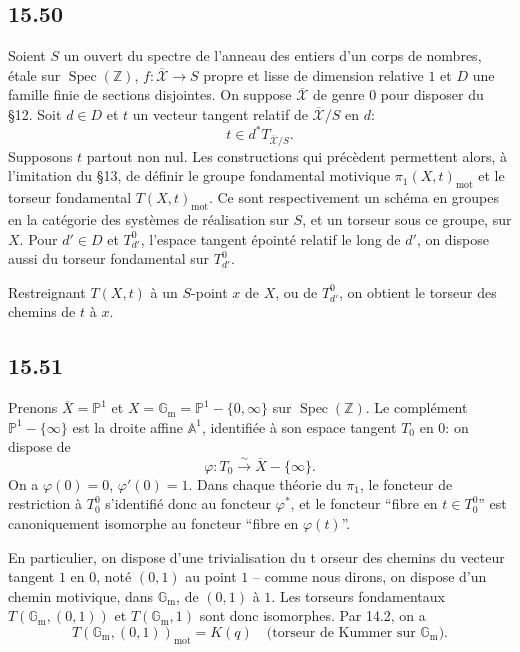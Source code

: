 \documentclass[12pt,a4paper]{article}
\theoremstyle{plain}
\theoremstyle{definition}
\theoremstyle{remark}
\DeclareMathOperator{\Spec}{Spec}
\newcommand*{\Gm}{\mathbb{G}_\mathrm{m}}
\newcommand{\bZ}{\mathbb{Z}}
\newcommand{\bP}{\mathbb{P}}
\newcommand{\bA}{\mathbb{A}}
\newcommand{\mot}{\mathrm{mot}}
\begin{document}
\subsection*{15.50}

Soient $S$ un ouvert du spectre de l'anneau des entiers d'un corps de nombres, étale sur $\Spec(\bZ)$, $f: \overline{\mathcal{X}} \to S$ propre et lisse de dimension relative $1$ et $D$ une famille finie de sections disjointes. On suppose $\overline{\mathcal{X}}$ de genre $0$ pour disposer du §12. Soit $d \in D$ et $t$ un vecteur tangent relatif de $\overline{\mathcal{X}}/S$ en $d$:
\[
t \in d^* T_{\overline{\mathcal{X}}/S}.
\]
Supposons $t$ partout non nul. Les constructions qui précèdent permettent alors, à l'imitation du §13, de définir le groupe fondamental motivique $\pi_1(X, t)_{\mot}$ et le torseur fondamental $T(X, t)_{\mot}$. Ce sont respectivement un schéma en groupes en la catégorie des systèmes de réalisation sur $S$, et un torseur sous ce groupe, sur $X$. Pour $d' \in D$ et $T_{d'}^0$, l'espace tangent épointé relatif le long de $d'$, on dispose aussi du torseur fondamental sur $T_{d'}^0$.

Restreignant $T(X, t)$ à un $S$-point $x$ de $X$, ou de $T_{d'}^0$, on obtient le torseur des chemins de $t$ à $x$.

\subsection*{15.51}

Prenons $\overline{X} = \bP^1$ et $X = \Gm = \bP^1 - \{0, \infty\}$ sur $\Spec(\bZ)$. Le complément $\bP^1 - \{\infty\}$ est la droite affine $\bA^1$, identifiée à son espace tangent $T_0$ en $0$: on dispose de
\[
\varphi: T_0 \xrightarrow{\sim} \overline{X} - \{\infty\}.
\]
On a $\varphi(0) = 0$, $\varphi'(0) = 1$. Dans chaque théorie du $\pi_1$, le foncteur de restriction à $T_0^0$ s'identifié donc au foncteur $\varphi^*$, et le foncteur ``fibre en $t \in T_0^0$'' est canoniquement isomorphe au foncteur ``fibre en $\varphi(t)$''.

En particulier, on dispose d'une trivialisation du t
orseur des chemins du vecteur tangent $1$ en $0$, noté $(0,1)$ au point $1$ -- comme nous dirons, on dispose d'un chemin motivique, dans $\Gm$, de $(0,1)$ à $1$. Les torseurs fondamentaux $T(\Gm, (0,1))$ et $T(\Gm, 1)$ sont donc isomorphes. Par 14.2, on a
\begin{equation}\label{eq:15.51.1}
T(\Gm, (0,1))_{\mot} = K(q) \quad \text{(torseur de Kummer sur } \Gm\text{)}.
\end{equation}
\end{document}

